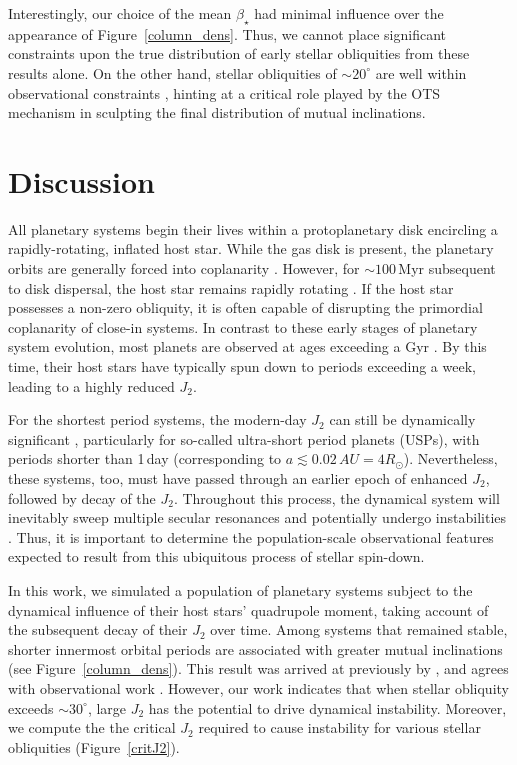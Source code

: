 \documentclass[twocolumn]{aastex63}
\begin{document}
Interestingly, our choice of the mean \(\beta_\star\) had minimal influence over the appearance of Figure~\ref{column_dens}. Thus, we cannot place significant constraints upon the true distribution of early stellar obliquities from these results alone. On the other hand, stellar obliquities of $\sim 20^\circ$ are well within observational constraints \citep{winn2017constraints}, hinting at a critical role played by the OTS mechanism in sculpting the final distribution of mutual inclinations.

\section{Discussion}\label{sec: Discussion}

All planetary systems begin their lives within a protoplanetary disk encircling a rapidly-rotating, inflated host star. While the gas disk is present, the planetary orbits are generally forced into coplanarity \citep{kley2012planet}. However, for $\sim 100$\,Myr subsequent to disk dispersal, the host star remains rapidly rotating \citep{bouvier2014angular,amard2016rotating}. If the host star possesses a non-zero obliquity, it is often capable of disrupting the primordial coplanarity of close-in systems. In contrast to these early stages of planetary system evolution, most planets are observed at ages exceeding a Gyr \citep{johnson2017california,petigura2017california}. By this time, their host stars have typically spun down to periods exceeding a week, leading to a highly reduced $J_2$. 

For the shortest period systems, the modern-day $J_2$ can still be dynamically significant \citep{li2020mutual,becker2020origin}, particularly for so-called ultra-short period planets (USPs), with periods shorter than 1\,day (corresponding to $a\lesssim 0.02\,AU=4R_\odot$). Nevertheless, these systems, too, must have passed through an earlier epoch of enhanced $J_2$, followed by decay of the $J_2$. Throughout this process, the dynamical system will inevitably sweep multiple secular resonances \citep{Ward1981solar} and potentially undergo instabilities \citep{spalding2018resilience}. Thus, it is important to determine the population-scale observational features expected to result from this ubiquitous process of stellar spin-down. 

In this work, we simulated a population of planetary systems subject to the dynamical influence of their host stars' quadrupole moment, taking account of the subsequent decay of their $J_2$ over time. Among systems that remained stable, shorter innermost orbital periods are associated with greater mutual inclinations (see Figure~\ref{column_dens}). This result was arrived at previously by \citet{li2020mutual}, and agrees with observational work \citep{dai2018larger}. However, our work indicates that when stellar obliquity exceeds $\sim 30^\circ$, large $J_2$ has the potential to drive dynamical instability. Moreover, we compute the the critical $J_2$ required to cause instability for various stellar obliquities (Figure~\ref{critJ2}).
\end{document}
